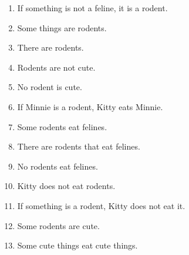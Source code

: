\begin{enumerate}
\begin{enumerate}

	\item If something is not a feline, it is a rodent.


	\item Some things are rodents.


	\item There are rodents.



	\item Rodents are not cute.


	\item No rodent is cute.


	\item If Minnie is a rodent, Kitty eats Minnie.


	\item Some rodents eat felines.


	\item There are rodents that eat felines.


	\item No rodents eat felines.


	\item Kitty does not eat rodents.


	\item If something is a rodent, Kitty does not eat it.


	\item Some rodents are cute.


	\item Some cute things eat cute things.


\end{enumerate}
\end{enumerate}
